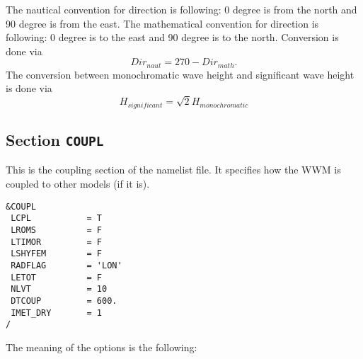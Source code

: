 \documentclass[12pt]{amsart}
\begin{document}
The nautical convention for direction is following: 0 degree is from the north and 90 degree is from the east.
The mathematical convention for direction is following: 0 degree is to the east and 90 degree is to the north.
Conversion is done via
\begin{equation*}
Dir_{naut} = 270 - Dir_{math}.
\end{equation*}
The conversion between monochromatic wave height and significant wave height is done via
\begin{equation*}
H_{significant} = \sqrt{2} H_{monochromatic}
\end{equation*}




\subsection{Section {\tt COUPL}}
This is the coupling section of the namelist file. It specifies how the WWM is coupled to other models (if it is).
\begin{verbatim}
&COUPL
 LCPL           = T                
 LROMS          = F                
 LTIMOR         = F                
 LSHYFEM        = F                
 RADFLAG        = 'LON'
 LETOT          = F                
 NLVT           = 10     
 DTCOUP         = 600.   
 IMET_DRY       = 1
/
\end{verbatim}
The meaning of the options is the following:
\end{document}
